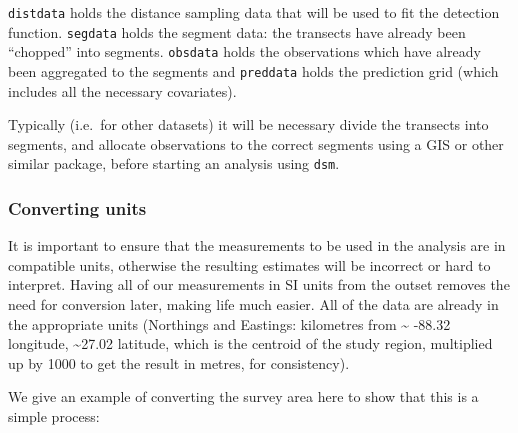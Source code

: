 \documentclass[]{amsart}
\newenvironment{Shaded}{}{}
\newcommand{\KeywordTok}[1]{\textcolor[rgb]{0.00,0.44,0.13}{\textbf{{#1}}}}
\newcommand{\DataTypeTok}[1]{\textcolor[rgb]{0.56,0.13,0.00}{{#1}}}
\newcommand{\DecValTok}[1]{\textcolor[rgb]{0.25,0.63,0.44}{{#1}}}
\newcommand{\FloatTok}[1]{\textcolor[rgb]{0.25,0.63,0.44}{{#1}}}
\newcommand{\StringTok}[1]{\textcolor[rgb]{0.25,0.44,0.63}{{#1}}}
\newcommand{\CommentTok}[1]{\textcolor[rgb]{0.38,0.63,0.69}{\textit{{#1}}}}
\newcommand{\NormalTok}[1]{{#1}}
\begin{document}
\texttt{distdata} holds the distance sampling data that will be used to
fit the detection function. \texttt{segdata} holds the segment data: the
transects have already been ``chopped'' into segments. \texttt{obsdata}
holds the observations which have already been aggregated to the
segments and \texttt{preddata} holds the prediction grid (which includes
all the necessary covariates).

Typically (i.e.~for other datasets) it will be necessary divide the
transects into segments, and allocate observations to the correct
segments using a GIS or other similar package, before starting an
analysis using \texttt{dsm}.

\subsubsection{Converting units}

It is important to ensure that the measurements to be used in the
analysis are in compatible units, otherwise the resulting estimates will
be incorrect or hard to interpret. Having all of our measurements in SI
units from the outset removes the need for conversion later, making life
much easier. All of the data are already in the appropriate units
(Northings and Eastings: kilometres from \textasciitilde{} -88.32
longitude, \textasciitilde{}27.02 latitude, which is the centroid of the
study region, multiplied up by 1000 to get the result in metres, for
consistency).

We give an example of converting the survey area here to show that this
is a simple process:

\begin{Shaded}
\end{Shaded}
\end{document}
